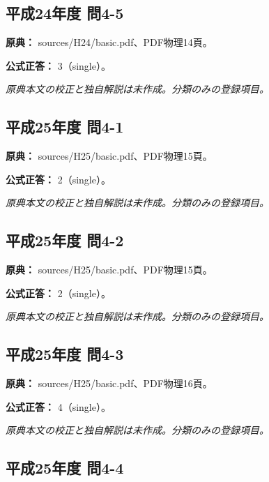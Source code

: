 \subsection{平成24年度 問4-5}
\label{q:h24-reg-basic-4-5}

\noindent\textbf{原典：} sources/H24/basic.pdf、PDF物理14頁。

\textbf{公式正答：} 3（single）。

\par\textit{原典本文の校正と独自解説は未作成。分類のみの登録項目。}

\subsection{平成25年度 問4-1}
\label{q:h25-reg-basic-4-1}

\noindent\textbf{原典：} sources/H25/basic.pdf、PDF物理15頁。

\textbf{公式正答：} 2（single）。

\par\textit{原典本文の校正と独自解説は未作成。分類のみの登録項目。}

\subsection{平成25年度 問4-2}
\label{q:h25-reg-basic-4-2}

\noindent\textbf{原典：} sources/H25/basic.pdf、PDF物理15頁。

\textbf{公式正答：} 2（single）。

\par\textit{原典本文の校正と独自解説は未作成。分類のみの登録項目。}

\subsection{平成25年度 問4-3}
\label{q:h25-reg-basic-4-3}

\noindent\textbf{原典：} sources/H25/basic.pdf、PDF物理16頁。

\textbf{公式正答：} 4（single）。

\par\textit{原典本文の校正と独自解説は未作成。分類のみの登録項目。}

\subsection{平成25年度 問4-4}
\label{q:h25-reg-basic-4-4}


